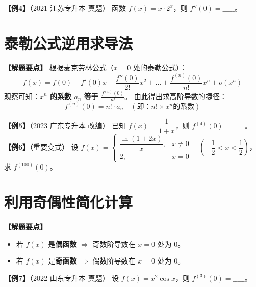 \documentclass[12pt,a4paper]{article}
\begin{document}
\textbf{【例4】}（2021 江苏专升本 真题）
函数 $f(x) = x \cdot 2^x$，则 $f''(0) = \_\_\_\_\_$。
\vspace{12em}
\newpage

\section{泰勒公式逆用求导法}

\textbf{【解题要点】}
根据麦克劳林公式（$x=0$ 处的泰勒公式）：
\[
f(x) = f(0) + f'(0)x + \frac{f''(0)}{2!}x^2 + \dots + \frac{f^{(n)}(0)}{n!}x^n + o(x^n)
\]
观察可知：\textbf{$x^n$ 的系数 $a_n$ 等于 $\frac{f^{(n)}(0)}{n!}$}。
由此得出求高阶导数的捷径：
\[
f^{(n)}(0) = n! \cdot a_n \quad (\text{即：} n! \times x^n \text{的系数})
\]

\vspace{1em}

\textbf{【例5】}（2023 广东专升本 改编）
已知 $f(x) = \dfrac{1}{1+x}$，则 $f^{(4)}(0) = \_\_\_\_\_$。
\vspace{14em}
\newline
\textbf{【例6】}（重要变式）
设 $ f(x) = \begin{cases} \dfrac{\ln(1+2x)}{x}, & x \neq 0 \\ 2, & x=0 \end{cases} \quad \left(-\dfrac{1}{2} < x < \dfrac{1}{2}\right) $，求 $ f^{(100)}(0) $。
\vspace{12em}
\newpage

\section{利用奇偶性简化计算}

\textbf{【解题要点】}
\begin{itemize}
    \item 若 $f(x)$ 是\textbf{偶函数} $\Rightarrow$ 奇数阶导数在 $x=0$ 处为 0。
    \item 若 $f(x)$ 是\textbf{奇函数} $\Rightarrow$ 偶数阶导数在 $x=0$ 处为 0。
\end{itemize}

\vspace{1em}

\textbf{【例7】}（2022 山东专升本 真题）
设 $f(x) = x^2 \cos x$，则 $f^{(3)}(0) = \_\_\_\_\_$。
\end{document}
